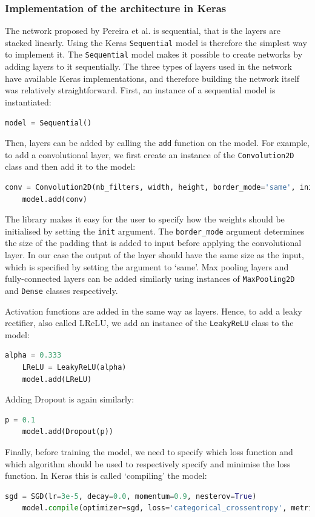 \documentclass[12pt,a4paper,twoside,openright]{report}
\begin{document}
\subsubsection{Implementation of the architecture in Keras}
The network proposed by Pereira et al. is sequential, that is the layers are stacked linearly. Using the Keras \texttt{Sequential} model is therefore the simplest way to implement it. The \texttt{Sequential} model makes it possible to create networks by adding layers to it sequentially. The three types of layers used in the network have available Keras implementations, and therefore building the network itself was relatively straightforward. First, an instance of a sequential model is instantiated:
\begin{lstlisting}[language=Python]
	model = Sequential()
\end{lstlisting}
Then, layers can be added by calling the \texttt{add} function on the model. For example, to add a convolutional layer, we first create an instance of the \texttt{Convolution2D} class and then add it to the model:
\begin{lstlisting}[language=Python]
	conv = Convolution2D(nb_filters, width, height, border_mode='same', init='glorot_normal')
	model.add(conv)
\end{lstlisting}
The library makes it easy for the user to specify how the weights should be initialised by setting the \texttt{init} argument. The \texttt{border\_mode} argument determines the size of the padding that is added to input before applying the convolutional layer. In our case the output of the layer should have the same size as the input, which is specified by setting the argument to `same'. Max pooling layers and fully-connected layers can be added similarly using instances of \texttt{MaxPooling2D} and \texttt{Dense} classes respectively.

Activation functions are added in the same way as layers. Hence, to add a leaky rectifier, also called LReLU, we add an instance of the \texttt{LeakyReLU} class to the model:
\begin{lstlisting}[language=Python]
	alpha = 0.333
	LReLU = LeakyReLU(alpha)
	model.add(LReLU)
\end{lstlisting}
Adding Dropout is again similarly:
\begin{lstlisting}[language=Python]
	p = 0.1
	model.add(Dropout(p))
\end{lstlisting}

Finally, before training the model, we need to specify which loss function and which algorithm should be used to respectively specify and minimise the loss function. In Keras this is called `compiling' the model:
\begin{lstlisting}[language=Python]
	sgd = SGD(lr=3e-5, decay=0.0, momentum=0.9, nesterov=True)
	model.compile(optimizer=sgd, loss='categorical_crossentropy', metrics=['accuracy']
\end{lstlisting}
\end{document}
